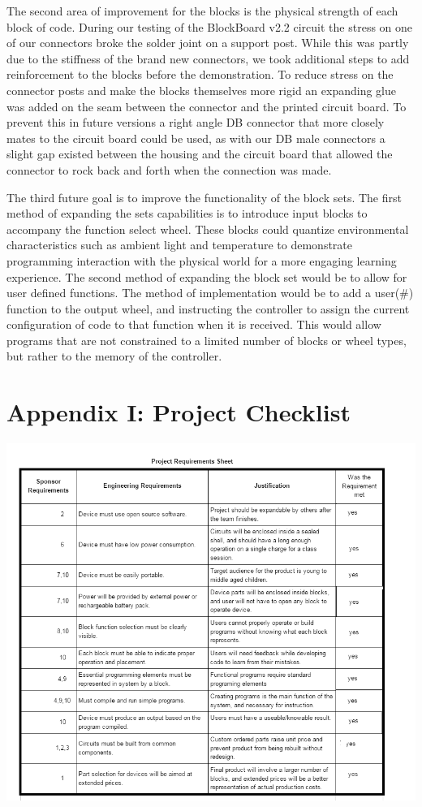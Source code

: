 \documentclass[12pt,a4paper]{article}
\begin{document}
     The second area of improvement for the blocks is the physical strength of each block of code. During our testing of the BlockBoard v2.2 circuit the stress on one of our connectors broke the solder joint on a support post. While this was partly due to the stiffness of the brand new connectors, we took additional steps to add reinforcement to the blocks before the demonstration. To reduce stress on the connector posts and make the blocks themselves more rigid an expanding glue was added on the seam between the connector and the printed circuit board. To prevent this in future versions a right angle DB connector that more closely mates to the circuit board could be used, as with our DB male connectors a slight gap existed between the housing and the circuit board that allowed the connector to rock back and forth when the connection was made.
     
     The third future goal is to improve the functionality of the block sets. The first method of expanding the set\textquotesingle s capabilities is to introduce input blocks to accompany the function select wheel. These blocks could quantize environmental characteristics such as ambient light and temperature to demonstrate programming interaction with the physical world for a more engaging learning experience. The second method of expanding the block set would be to allow for user defined functions. The method of implementation would be to add a user(\#) function to the output wheel, and instructing the controller to assign the current configuration of code to that function when it is received. This would allow programs that are not constrained to a limited number of blocks or wheel types, but rather to the memory of the controller. 
     
  \section{Appendix I: Project Checklist} 
  \includegraphics[width=6.5in]{pds2.png}
\end{document}
